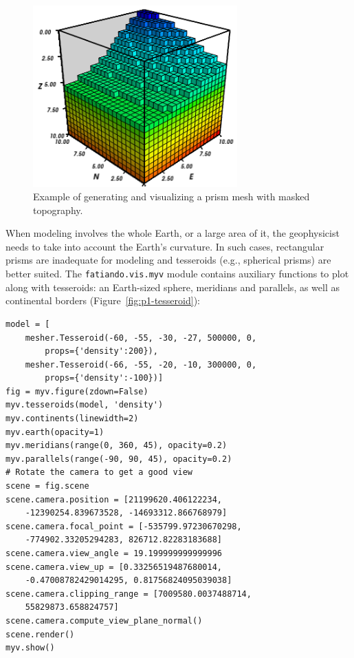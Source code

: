 \begin{figure}
    \centering
    \includegraphics[width=0.7\textwidth]{figures/paper-fatiando/meshes_3dplotting_meshtopo}
    \caption{
        Example of generating and visualizing a prism mesh with masked
        topography.
    }
    \label{fig:p1-meshtopo}
\end{figure}

When modeling involves the whole Earth, or a large area of it, the
geophysicist needs to take into account the Earth's curvature. In such
cases, rectangular prisms are inadequate for modeling and tesseroids
(e.g., spherical prisms) are better suited. The
\texttt{fatiando.vis.myv} module contains auxiliary functions to plot
along with tesseroids: an Earth-sized sphere, meridians and parallels,
as well as continental borders (Figure~\ref{fig:p1-tesseroid}):

\begin{verbatim}
model = [
    mesher.Tesseroid(-60, -55, -30, -27, 500000, 0,
        props={'density':200}),
    mesher.Tesseroid(-66, -55, -20, -10, 300000, 0,
        props={'density':-100})]
fig = myv.figure(zdown=False)
myv.tesseroids(model, 'density')
myv.continents(linewidth=2)
myv.earth(opacity=1)
myv.meridians(range(0, 360, 45), opacity=0.2)
myv.parallels(range(-90, 90, 45), opacity=0.2)
# Rotate the camera to get a good view
scene = fig.scene
scene.camera.position = [21199620.406122234,
    -12390254.839673528, -14693312.866768979]
scene.camera.focal_point = [-535799.97230670298,
    -774902.33205294283, 826712.82283183688]
scene.camera.view_angle = 19.199999999999996
scene.camera.view_up = [0.33256519487680014,
    -0.47008782429014295, 0.81756824095039038]
scene.camera.clipping_range = [7009580.0037488714,
    55829873.658824757]
scene.camera.compute_view_plane_normal()
scene.render()
myv.show()
\end{verbatim}

